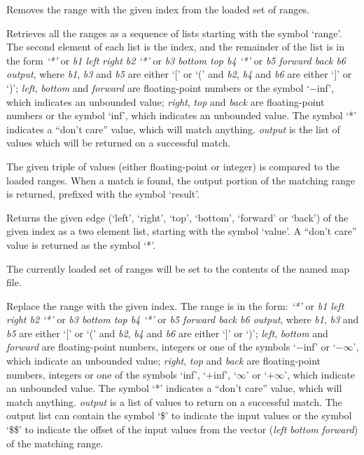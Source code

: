   Removes the range with the given index from the loaded set of ranges.

  Retrieves all the ranges as a sequence of lists starting with the symbol `range'.
  The second element of each list is the index, and the remainder of the list is in the form
  \emph{`*'} or \emph{b1 left right b2} \emph{`*'} or \emph{b3 bottom top b4} \emph{`*'} or \emph{b5 forward back b6 output}, where \emph{b1}, \emph{b3} and \emph{b5}
  are either `[' or `(' and \emph{b2}, \emph{b4} and \emph{b6} are either `]' or `)';
  \emph{left}, \emph{bottom} and \emph{forward} are floating-point numbers or the symbol `$-$inf',
  which indicates an unbounded value; \emph{right}, \emph{top} and \emph{back} are floating-point numbers or
  the symbol `inf', which indicates an unbounded value.
  The symbol `*' indicates a ``don't care'' value, which will match anything.
  \emph{output} is the list of values which will be returned on a successful match.

  The given triple of values (either floating-point or integer) is compared to the loaded ranges.
  When a match is found, the output portion of the matching range is returned, prefixed with the symbol
  `result'.
  
  Returns the given edge (`left', `right', `top', `bottom', `forward' or `back') of the given index as a
  two element list, starting with the symbol `value'.
  A ``don't care'' value is returned as the symbol `*'.

  The currently loaded set of ranges will be set to the contents of the named map file.
  
  Replace the range with the given index.
  The range is in the form: \emph{`*'} or \emph{b1 left right b2} \emph{`*'} or \emph{b3 bottom top b4} \emph{`*'} or \emph{b5 forward back b6 output}, where
  \emph{b1}, \emph{b3} and \emph{b5} are either `[' or `(' and \emph{b2}, \emph{b4} and \emph{b6} are
  either `]' or `)';
  \emph{left}, \emph{bottom} and \emph{forward} are floating-point numbers, integers or one of the symbols `$-$inf' or
  `$-\infty$', which indicate an unbounded value;
  \emph{right}, \emph{top} and \emph{back} are floating-point numbers, integers or one of the symbols `inf', `$+$inf',
  `$\infty$' or `$+\infty$', which indicate an unbounded value.
  The symbol `*' indicates a ``don't care'' value, which will match anything.
  \emph{output} is a list of values to return on a successful match.
  The output list can contain the symbol `\$' to indicate the input values or the symbol `\$\$' to
  indicate the offset of the input values from the vector (\emph{left} \emph{bottom} \emph{forward}) of the
  matching range.
  
